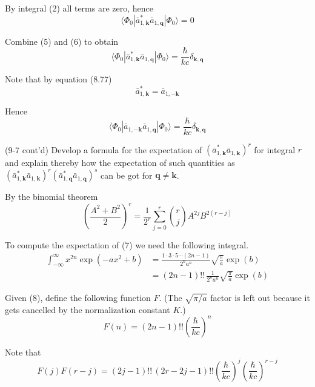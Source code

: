 \documentclass[12pt]{article}
\begin{document}
By integral (2) all terms are zero, hence
\begin{equation*}
\langle\Phi_0|\bar a_{1,\mathbf k}^*\bar a_{1,\mathbf q}|\Phi_0\rangle=0
\tag{6}
\end{equation*}

Combine (5) and (6) to obtain
\begin{equation*}
\langle\Phi_0|\bar a_{1,\mathbf k}^*\bar a_{1,\mathbf q}|\Phi_0\rangle=\frac{\hbar}{kc}\delta_{\mathbf k,\mathbf q}
\end{equation*}

Note that by equation (8.77)
\begin{equation*}
\bar a_{1,\mathbf k}^*=\bar a_{1,-\mathbf k}
\end{equation*}

Hence
\begin{equation*}
\langle\Phi_0|\bar a_{1,-\mathbf k}\bar a_{1,\mathbf q}|\Phi_0\rangle=\frac{\hbar}{kc}\delta_{\mathbf k,\mathbf q}
\end{equation*}

(9-7 cont'd)
Develop a formula for the expectation of
$(\bar a_{1,\mathbf k}^*\bar a_{1,\mathbf k})^r$
for integral $r$ and explain thereby how the expectation of such
quantities as
$(\bar a_{1,\mathbf k}^*\bar a_{1,\mathbf k})^r
(\bar a_{1,\mathbf q}^*\bar a_{1,\mathbf q})^s$
can be got for $\mathbf q\ne\mathbf k$.

\bigskip
By the binomial theorem
\begin{equation*}
\left(\frac{A^2+B^2}{2}\right)^r=\frac{1}{2^r}\sum_{j=0}^r\binom{r}{j}A^{2j}B^{2(r-j)}
\tag{7}
\end{equation*}

To compute the expectation of (7) we need the following integral.
\begin{align*}
\int_{-\infty}^\infty x^{2n}\exp(-ax^2+b)
&=\frac{1\cdot3\cdot5\cdots(2n-1)}{2^na^n}\sqrt{\frac{\pi}{a}}\exp(b)
\\
&=(2n-1)!!\,\frac{1}{2^na^n}\sqrt{\frac{\pi}{a}}\exp(b)
\tag{8}
\end{align*}

Given (8), define the following function $F$.
(The $\sqrt{\pi/a}$ factor is left out because it gets cancelled by the normalization constant $K$.)
\begin{equation*}
F(n)=(2n-1)!!\left(\frac{\hbar}{kc}\right)^n
\end{equation*}

Note that
\begin{equation*}
F(j)F(r-j)=
(2j-1)!!\,(2r-2j-1)!!
\left(\frac{\hbar}{kc}\right)^j
\left(\frac{\hbar}{kc}\right)^{r-j}
\end{equation*}
\end{document}

